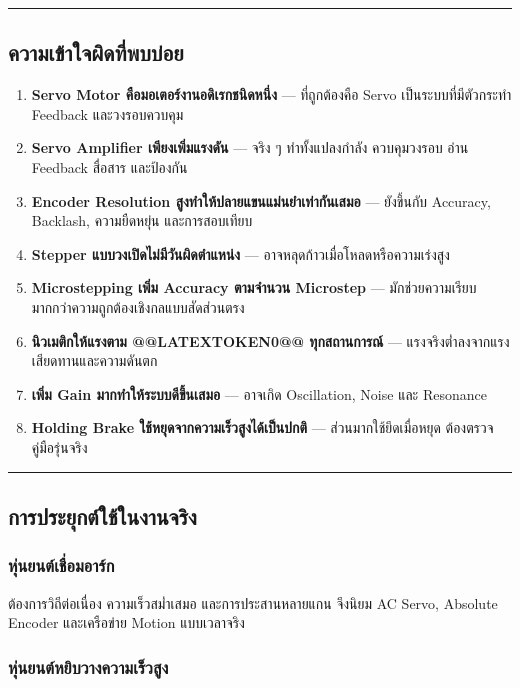 \par\noindent\rule{\textwidth}{0.4pt}\par

\subsection{ความเข้าใจผิดที่พบบ่อย}

\begin{enumerate}
    \item \textbf{Servo Motor คือมอเตอร์งานอดิเรกชนิดหนึ่ง} — ที่ถูกต้องคือ Servo เป็นระบบที่มีตัวกระทำ Feedback และวงรอบควบคุม
    \item \textbf{Servo Amplifier เพียงเพิ่มแรงดัน} — จริง ๆ ทำทั้งแปลงกำลัง ควบคุมวงรอบ อ่าน Feedback สื่อสาร และป้องกัน
    \item \textbf{Encoder Resolution สูงทำให้ปลายแขนแม่นยำเท่ากันเสมอ} — ยังขึ้นกับ Accuracy, Backlash, ความยืดหยุ่น และการสอบเทียบ
    \item \textbf{Stepper แบบวงเปิดไม่มีวันผิดตำแหน่ง} — อาจหลุดก้าวเมื่อโหลดหรือความเร่งสูง
    \item \textbf{Microstepping เพิ่ม Accuracy ตามจำนวน Microstep} — มักช่วยความเรียบมากกว่าความถูกต้องเชิงกลแบบสัดส่วนตรง
    \item \textbf{นิวเมติกให้แรงตาม @@LATEXTOKEN0@@ ทุกสถานการณ์} — แรงจริงต่ำลงจากแรงเสียดทานและความดันตก
    \item \textbf{เพิ่ม Gain มากทำให้ระบบดีขึ้นเสมอ} — อาจเกิด Oscillation, Noise และ Resonance
    \item \textbf{Holding Brake ใช้หยุดจากความเร็วสูงได้เป็นปกติ} — ส่วนมากใช้ยึดเมื่อหยุด ต้องตรวจคู่มือรุ่นจริง
\end{enumerate}

\par\noindent\rule{\textwidth}{0.4pt}\par

\subsection{การประยุกต์ใช้ในงานจริง}

\subsubsection{หุ่นยนต์เชื่อมอาร์ก}

ต้องการวิถีต่อเนื่อง ความเร็วสม่ำเสมอ และการประสานหลายแกน จึงนิยม AC Servo, Absolute Encoder และเครือข่าย Motion แบบเวลาจริง

\subsubsection{หุ่นยนต์หยิบวางความเร็วสูง}

